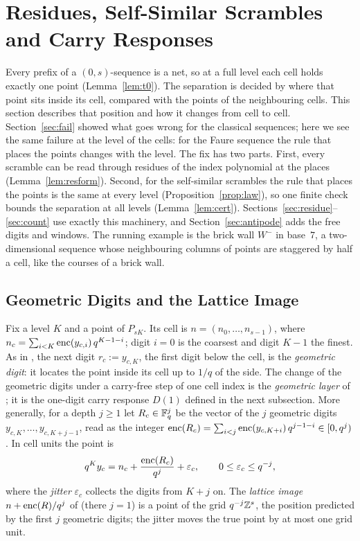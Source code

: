 %
\section{Residues, Self-Similar Scrambles and Carry Responses}\label{sec:law}
Every prefix of a $(0,s)$-sequence is a net, so at a full level each cell holds exactly one point (Lemma~\ref{lem:t0}). The separation is decided by where that point sits inside its cell, compared with the points of the neighbouring cells. This section describes that position and how it changes from cell to cell. Section~\ref{sec:fail} showed what goes wrong for the classical sequences; here we see the same failure at the level of the cells: for the Faure sequence the rule that places the points changes with the level. The fix has two parts. First, every scramble can be read through residues of the index polynomial at the places (Lemma~\ref{lem:resform}). Second, for the self-similar scrambles the rule that places the points is the same at every level (Proposition~\ref{prop:law}), so one finite check bounds the separation at all levels (Lemma~\ref{lem:cert}). Sections~\ref{sec:residue}--\ref{sec:count} use exactly this machinery, and Section~\ref{sec:antipode} adds the free digits and windows. The running example is the brick wall $W^-$ in base~$7$, a two-dimensional sequence whose neighbouring columns of points are staggered by half a cell, like the courses of a brick wall.

\subsection{Geometric Digits and the Lattice Image}
Fix a level $K$ and a point of $P_{sK}$. Its cell is $n=(n_0,\dots,n_{s-1})$, where $n_c=\sum_{i<K}\operatorname{enc}(y_{c,i})\,q^{K-1-i}$; digit $i=0$ is the coarsest and digit $K-1$ the finest. As in \cite{Gru26geo}%
, the next digit $r_c:=y_{c,K}$, the first digit below the cell, is the \emph{geometric digit}: it locates the point inside its cell up to $1/q$ of the side. The change of the geometric digits under a carry-free step of one cell index is the \emph{geometric layer} of \cite{Gru26geo}; it is the one-digit carry response $D(1)$ defined in the next subsection. More generally, for a depth $j\ge1$ let $R_c\in\mathbb{F}_q^j$ be the vector of the $j$ geometric digits $y_{c,K},\dots,y_{c,K+j-1}$, read as the integer $\operatorname{enc}(R_c)=\sum_{i<j}\operatorname{enc}(y_{c,K+i})\,q^{j-1-i}\in[0,q^j)$. In cell units the point is
\begin{equation}\label{eq:cellunits}
q^Ky_c=n_c+\frac{\operatorname{enc}(R_c)}{q^j}+\varepsilon_c,\qquad 0\le\varepsilon_c\le q^{-j},
\end{equation}
where the \emph{jitter} $\varepsilon_c$ collects the digits from $K+j$ on. The \emph{lattice image} $n+\operatorname{enc}(R)/q^j$ of \cite{Gru26geo} (there $j=1$) is a point of the grid $q^{-j}\mathbb{Z}^s$, the position predicted by the first $j$ geometric digits; the jitter moves the true point by at most one grid unit.

